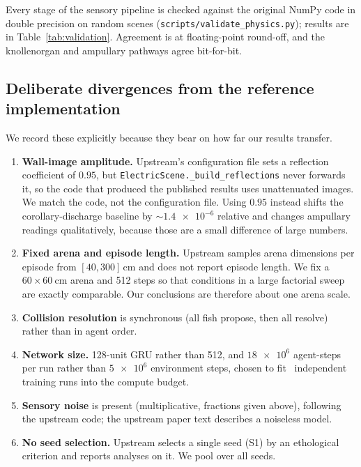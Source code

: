 Every stage of the sensory pipeline is checked against the original NumPy code in
double precision on random scenes (\texttt{scripts/validate\_physics.py}); results
are in Table~\ref{tab:validation}. Agreement is at floating-point round-off, and
the knollenorgan and ampullary pathways agree bit-for-bit.

\subsection{Deliberate divergences from the reference implementation}
\label{sec:divergences}

We record these explicitly because they bear on how far our results transfer.

\begin{enumerate}[leftmargin=1.4em,itemsep=1pt,topsep=2pt]
\item \textbf{Wall-image amplitude.} Upstream's configuration file sets a
      reflection coefficient of $0.95$, but \texttt{ElectricScene.\_build\_reflections}
      never forwards it, so the code that produced the published results uses
      unattenuated images. We match the code, not the configuration file. Using
      $0.95$ instead shifts the corollary-discharge baseline by $\sim\num{1.4e-6}$
      relative and changes ampullary readings qualitatively, because those are a
      small difference of large numbers.
\item \textbf{Fixed arena and episode length.} Upstream samples arena dimensions
      per episode from $[40,300]\,\si{\centi\metre}$ and does not report episode
      length. We fix a $60\times\SI{60}{\centi\metre}$ arena and 512 steps so that
      conditions in a large factorial sweep are exactly comparable. Our
      conclusions are therefore about one arena scale.
\item \textbf{Collision resolution} is synchronous (all fish propose, then all
      resolve) rather than in agent order.
\item \textbf{Network size.} 128-unit GRU rather than 512, and $\num{18e6}$
      agent-steps per run rather than $\num{5e6}$ environment steps, chosen to fit
      \NumRuns\ independent training runs into the compute budget.
\item \textbf{Sensory noise} is present (multiplicative, fractions given above),
      following the upstream code; the upstream paper text describes a noiseless
      model.
\item \textbf{No seed selection.} Upstream selects a single seed (S1) by an
      ethological criterion and reports analyses on it. We pool over all seeds.
\end{enumerate}
